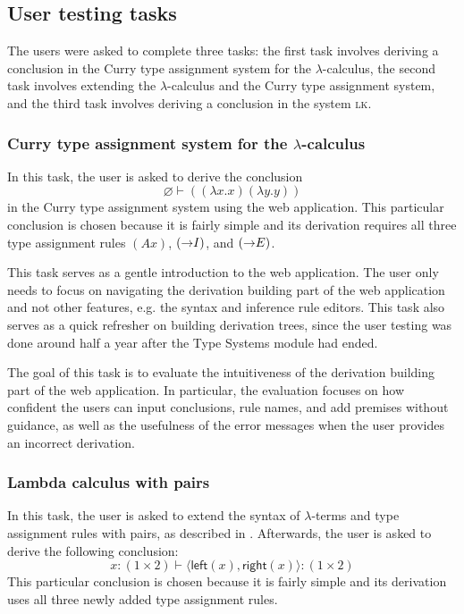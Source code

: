 \subsection{User testing tasks}
The users were asked to complete three tasks: the first task involves deriving a conclusion in the Curry type assignment system for the $\lambda$-calculus, the second task involves extending the $\lambda$-calculus and the Curry type assignment system, and the third task involves deriving a conclusion in the system \textsc{lk}.

\subsubsection{Curry type assignment system for the $\lambda$-calculus}
In this task, the user is asked to derive the conclusion
\[
    \varnothing \vdash ((\lambda x. x)(\lambda y. y))
\]
in the Curry type assignment system using the web application. This particular conclusion is chosen because it is fairly simple and its derivation requires all three type assignment rules $(Ax)$, $(\mathord{\to} I)$, and $(\mathord{\to} E)$.

This task serves as a gentle introduction to the web application. The user only needs to focus on navigating the derivation building part of the web application and not other features, e.g. the syntax and inference rule editors. This task also serves as a quick refresher on building derivation trees, since the user testing was done around half a year after the Type Systems module had ended.

The goal of this task is to evaluate the intuitiveness of the derivation building part of the web application. In particular, the evaluation focuses on how confident the users can input conclusions, rule names, and add premises without guidance, as well as the usefulness of the error messages when the user provides an incorrect derivation.

\subsubsection{Lambda calculus with pairs}
In this task, the user is asked to extend the syntax of $\lambda$-terms and type assignment rules with pairs, as described in . Afterwards, the user is asked to derive the following conclusion:
\[
    x: (1 \times 2) \vdash \langle \textsf{left}(x), \textsf{right}(x) \rangle: (1 \times 2)
\]
This particular conclusion is chosen because it is fairly simple and its derivation uses all three newly added type assignment rules.

